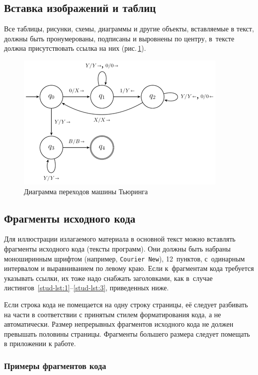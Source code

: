 \documentclass[14pt]{mmcs_article}
\begin{document}
\subsection{Вставка изображений и таблиц}

Все таблицы, рисунки, схемы, диаграммы и другие объекты, вставляемые в текст, должны быть пронумерованы, подписаны и выровнены по центру, в~тексте должна присутствовать ссылка на них (рис.\,\ref{stud:fig:1}).


\begin{figure}[H]
  \centering
  \includegraphics[scale=1.2]{Fig_T.png}
  \caption{Диаграмма переходов машины Тьюринга}\label{stud:fig:1}
\end{figure}


\subsection{Фрагменты исходного кода}

Для иллюстрации излагаемого материала в основной текст можно вставлять фрагменты исходного кода (тексты программ). Они должны быть набраны моноширинным шрифтом (например, \texttt{Courier New}), 12~пунктов, с~одинарным интервалом и выравниванием по левому краю. Если к~фрагментам кода требуется указывать ссылки, их тоже надо снабжать заголовками, как в~случае листингов~\ref{stud-lst:1}--\ref{stud-lst:3}, приведенных ниже.

Если строка кода не помещается на одну строку страницы, её следует разбивать на части в соответствии с принятым стилем форматирования кода, а не автоматически. Размер непрерывных фрагментов исходного кода не должен превышать половины страницы. Фрагменты большего размера следует помещать в приложении к работе.


\subsubsection{Примеры фрагментов кода}
\end{document}
